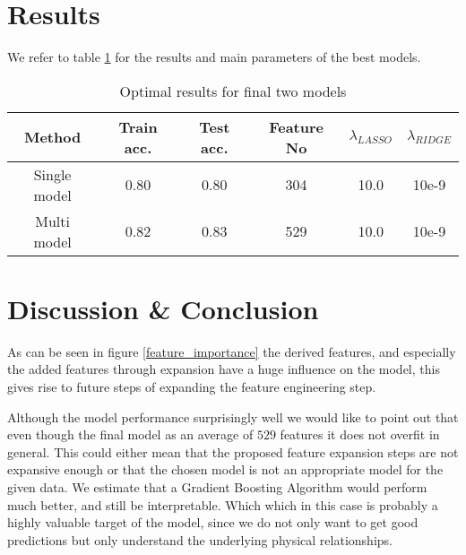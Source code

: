 \documentclass[a4paper, 10pt, conference]{ieeeconf}      %
\begin{document}
\section{Results}

We refer to table \ref{table:hyper} for the results and main parameters of the best models.


\begin{table}[h!]
\scriptsize
\begin{tabular}{| c | c | c | c | c | c |}
      \hline
      Method          & Train acc.& Test acc.& Feature No &$\lambda_{LASSO}$ & $\lambda_{RIDGE}$  \\
      \hline
      Single model   & 0.80  &  0.80 &304 &  10.0 & 10e-9          \\
      \hline
      Multi model   & 0.82 &  0.83 &529  & 10.0   &  10e-9                \\
      \hline
\end{tabular}
\caption{Optimal results for final two models}
\label{table:hyper}
\end{table}
    
\section{Discussion \& Conclusion}

As can be seen in figure \ref{feature_importance} the derived features, and especially the added features through expansion have a huge influence on the model, this gives rise to future steps of expanding the feature engineering step. 

Although the model performance surprisingly well we would like to point out
that even though the final model as an average of $529$ features it does not
overfit in general. This could either mean that the proposed feature expansion
steps are not expansive enough or that the chosen model is not an appropriate
model for the given data. We estimate that a Gradient Boosting Algorithm would
perform much better, and still be interpretable. Which which in this case is
probably a highly valuable target of the model, since we do not only want to
get good predictions but only understand the underlying physical relationships.\\
\end{document}
